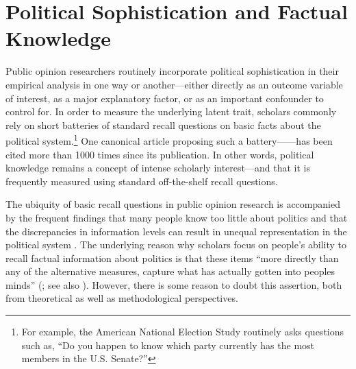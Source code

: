 \section*{Political Sophistication and Factual Knowledge}


Public opinion researchers routinely incorporate political sophistication in their empirical analysis in one way or another---either directly as an outcome variable of interest, as a major explanatory factor, or as an important confounder to control for. In order to measure the underlying latent trait, scholars commonly rely on short batteries of standard recall questions on basic facts about the political system.\footnote{For example, the American National Election Study routinely asks questions such as, ``Do you happen to know which party currently has the most members in the U.S. Senate?''} One canonical article proposing such a battery---\citet{carpini1993measuring}---has been cited more than 1000 times since its publication. In other words, political knowledge remains a concept of intense scholarly interest---and that it is frequently measured using standard off-the-shelf recall questions.

The ubiquity of basic recall questions in public opinion research is accompanied by the frequent findings that many people know too little about politics \citep{carpini1996americans,barabas2014question} and that the discrepancies in information levels can result in unequal representation in the political system \citep{althaus1998information,kuklinski2000misinformation,gilens2001political}. The underlying reason why scholars focus on people's ability to recall factual information about politics is that these items ``more directly than any of the alternative measures, capture what has actually gotten into peoples minds'' (\citealt[21]{zaller1992nature}; see also \citealt{zaller1991information,gomez2001political}). However, there is some reason to doubt this assertion, both from theoretical as well as methodological perspectives.

